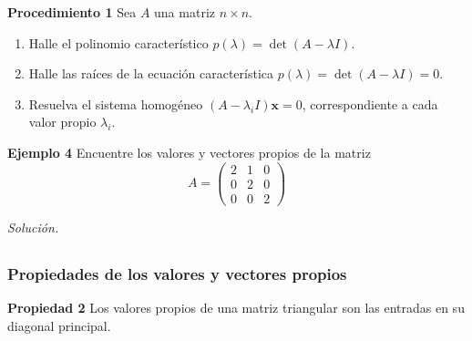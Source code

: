 \begin{frame}%

\begin{ejem}{\textbf{Procedimiento 1}}\justifying
	\justifying
	Sea $A$ una matriz $n\times n$. 
	\begin{enumerate}
		\item Halle el polinomio característico $p(\lambda) = \det(A-\lambda I)$.
		\item Halle las raíces de la ecuación característica $p(\lambda) = \det(A-\lambda I) = 0$.
		\item Resuelva el sistema homogéneo $(A-\lambda_i I) \mathbf{x} = 0$, correspondiente a cada valor propio $\lambda_i$.
	\end{enumerate}
\end{ejem}	

\begin{ej}{\textbf{Ejemplo 4}}
	Encuentre los valores y vectores propios de la matriz
	\[
	A =
	\left(
	\begin{array}{rrr}
	2 & 1 &  0\\[1mm]
	0 & 2 &  0\\[1mm]
	0 & 0 & 2
	\end{array}
	\right)
	\]	
\end{ej}
\textit{Solución.}

\end{frame}


\subsection{}

\begin{frame}\frametitle{Propiedades de los valores y vectores propios}
	
	\begin{prop}{\textbf{Propiedad 2}}
		\justifying
		Los valores propios de una matriz triangular son las entradas en su diagonal principal.
	\end{prop}	
		
\end{frame}


\subsection{}

